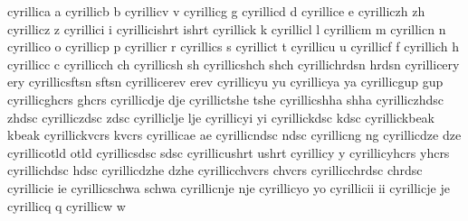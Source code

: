  cyrillica      {a}
 cyrillicb      {b}
 cyrillicv      {v}
 cyrillicg      {g}
 cyrillicd      {d}
 cyrillice      {e}
 cyrilliczh     {zh}
 cyrillicz      {z}
 cyrillici      {i}
 cyrillicishrt  {ishrt}
 cyrillick      {k}
 cyrillicl      {l}
 cyrillicm      {m}
 cyrillicn      {n}
 cyrillico      {o}
 cyrillicp      {p}
 cyrillicr      {r}
 cyrillics      {s}
 cyrillict      {t}
 cyrillicu      {u}
 cyrillicf      {f}
 cyrillich      {h}
 cyrillicc      {c}
 cyrillicch     {ch}
 cyrillicsh     {sh}
 cyrillicshch   {shch}
 cyrillichrdsn  {hrdsn}
 cyrillicery    {ery}
 cyrillicsftsn  {sftsn}
 cyrillicerev   {erev}
 cyrillicyu     {yu}
 cyrillicya     {ya}
 cyrillicgup    {gup}
 cyrillicghcrs  {ghcrs}
 cyrillicdje    {dje}
 cyrillictshe   {tshe}
 cyrillicshha   {shha}
 cyrilliczhdsc  {zhdsc}
 cyrilliczdsc   {zdsc}
 cyrilliclje    {lje}
 cyrillicyi     {yi}
 cyrillickdsc   {kdsc}
 cyrillickbeak  {kbeak}
 cyrillickvcrs  {kvcrs}
 cyrillicae     {ae}
 cyrillicndsc   {ndsc}
 cyrillicng     {ng}
 cyrillicdze    {dze}
 cyrillicotld   {otld}
 cyrillicsdsc   {sdsc}
 cyrillicushrt  {ushrt}
 cyrillicy      {y}
 cyrillicyhcrs  {yhcrs}
 cyrillichdsc   {hdsc}
 cyrillicdzhe   {dzhe}
 cyrillicchvcrs {chvcrs}
 cyrillicchrdsc {chrdsc}
 cyrillicie     {ie}
 cyrillicschwa  {schwa}
 cyrillicnje    {nje}
 cyrillicyo     {yo}
 cyrillicii     {ii}
 cyrillicje     {je}
 cyrillicq      {q}
 cyrillicw      {w}

\stopencoding


\startencoding[default]

